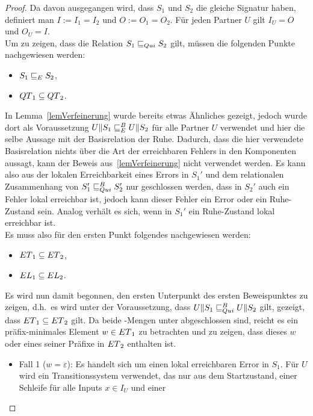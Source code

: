 \begin{proof}
  Da davon ausgegangen wird, dass $S_1$ und $S_2$ die gleiche Signatur haben,
  definiert man $I:=I_1=I_2$ und $O:=O_1=O_2$. Für jeden Partner $U$ gilt
  $I_U=O$ und $O_U=I$.\\
  Um zu zeigen, dass die Relation $S_1\sqsubseteq _{Qui} S_2$ gilt, müssen die
  folgenden Punkte nachgewiesen werden:
  \begin{itemize}
    \item $S_1\sqsubseteq _E S_2$,
    \item $QT{}_1\subseteq QT{}_2$.
  \end{itemize}
  In Lemma~\ref{lemVerfeinerung} wurde bereits etwas Ähnliches gezeigt, jedoch
  wurde dort als Voraussetzung $U\|S_1\sqsubseteq _E^B U\|S_2$ für alle Partner $U$
  verwendet und hier die selbe Aussage mit der Basisrelation der Ruhe. Dadurch,
  dass die hier verwendete Basisrelation nichts über die Art der erreichbaren
  Fehlers in den Komponenten aussagt, kann der Beweis aus~\ref{lemVerfeinerung}
  nicht verwendet werden. Es kann also aus der lokalen Erreichbarkeit eines
  Errors in $S_1'$ und dem relationalen Zusammenhang von $S_1'\sqsubseteq _{Qui}^B S_2'$ nur
  geschlossen werden, dass in $S_2'$ auch ein Fehler lokal erreichbar ist,
  jedoch kann dieser Fehler ein Error oder ein Ruhe-Zustand sein. Analog
  verhält es sich, wenn in $S_1'$ ein Ruhe-Zustand lokal erreichbar ist.\\
  Es muss also für den ersten Punkt folgendes nachgewiesen werden:
  \begin{itemize}
    \item $ET{}_1\subseteq ET{}_2$,
    \item $EL{}_1\subseteq EL{}_2$.
  \end{itemize}
  Es wird nun damit begonnen, den ersten Unterpunkt des ersten Beweispunktes zu
  zeigen, d.h.\ es wird unter der Voraussetzung, dass $U\|S_1\sqsubseteq _{Qui}^B U\|S_2$
  gilt, gezeigt, dass $ET{}_1\subseteq ET{}_2$ gilt. Da beide \ET{}-Mengen
  unter \cont{} abgeschlossen sind, reicht es ein präfix-minimales Element
  $w\in ET{}_1$ zu betrachten und zu zeigen, dass dieses $w$ oder eines seiner
  Präfixe in $ET{}_2$ enthalten ist.
  \begin{itemize}
    \item Fall 1 ($w=\varepsilon$): Es handelt sich um einen lokal erreichbaren
      Error in $S_1$. Für $U$ wird ein Transitionssystem verwendet, das nur aus
      dem Startzustand, einer Schleife für alle Inputs $x\in I_U$ und einer

\end{itemize}
\end{proof}
